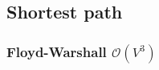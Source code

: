 \documentclass{article}
\begin{document}
\subsection{Shortest path}

\begin{comment}
\subsubsection{BFS $\mathcal{O}(V + E)$}

\begin{lstlisting}
int n, dist[MAXN];
vector<int> edges[MAXN]; // (to, cost)

// faster than dijkstra when all edge costs are the same
int bfs(int from, int to) {
	fill_n(dist, n, -1);
	dist[from] = 0;

	queue<int> q;
	q.push(from);
	while (!q.empty()) {
		int cur = q.front();
		q.pop();
		for (int nxt : edges[cur]) {
			if (dist[nxt] >= 0) {
				dist[nxt] = dist[cur] + 1;
				if (nxt == to) return dist[nxt];
				q.push(nxt);
			}
		}
	}
	return -1;
}

\end{lstlisting}
\end{comment}

\begin{comment}
\subsubsection{Dijkstra $\mathcal{O}(E + V \log V)$}

\begin{lstlisting}
int n, dist[MAXN];
bool vis[MAXN];
vector<pii> edges[MAXN]; // (to, cost)

void dijkstra() {
	fill_n(vis, n, false);
	priority_queue<pii, vector<pii>, greater<pii> > q; // (dist, vertex)
	q.push(pii(0, 0));

	while (!q.empty()) {
		pii v = q.top();
		q.pop();

		if (vis[v.second]) continue;
		vis[v.second] = true;

		for (const pii e : edges[v.second]) {
			q.push(pii(v.first + e.second, e.first));
		}
		dist[v.second] = v.first;
	}
}
\end{lstlisting}
\end{comment}

\subsubsection{Floyd-Warshall $\mathcal{O}(V^{3})$}
\end{document}

